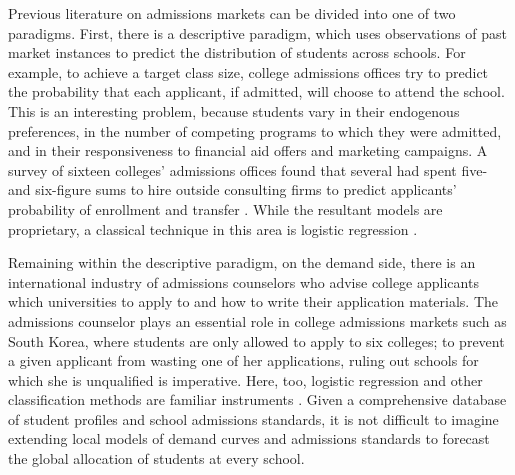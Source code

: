 \documentclass[12pt]{article}
\theoremstyle{definition}
\begin{document}
Previous literature on admissions markets can be divided into one of two paradigms. First, there is a descriptive paradigm, which uses observations of past market instances to predict the distribution of students across schools. For example, to achieve a target class size, college admissions offices try to predict the probability that each applicant, if admitted, will choose to attend the school. This is an interesting problem, because students vary in their endogenous preferences, in the number of competing programs to which they were admitted, and in their responsiveness to financial aid offers and marketing campaigns. A survey of sixteen colleges' admissions offices found that several had spent five- and six-figure sums to hire outside consulting firms to predict applicants' probability of enrollment and transfer \parencite[][]{estimatingapplications}. While the resultant models are proprietary, a classical technique in this area is logistic regression \parencite[][]{understandingandpredictingtheyield}.
 
Remaining within the descriptive paradigm, on the demand side, there is an international industry of admissions counselors who advise college applicants which universities to apply to and how to write their application materials. The admissions counselor plays an essential role in college admissions markets such as South Korea, where students are only allowed to apply to six colleges; to prevent a given applicant from wasting one of her applications, ruling out schools for which she is unqualified is imperative. Here, too, logistic regression and other classification methods are familiar instruments \parencite[][]{asimulationapproachtopredictingcollegeadmissions}. Given a comprehensive database of student profiles and school admissions standards, it is not difficult to imagine extending local models of demand curves and admissions standards to forecast the global allocation of students at every school. %
\end{document}
